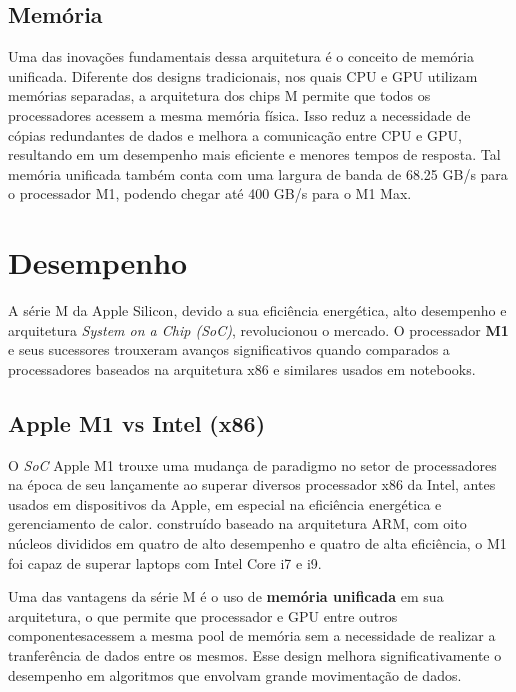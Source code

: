 \documentclass[a4paper,times,12pt]{article}
\begin{document}
\subsection{Memória}
Uma das inovações fundamentais dessa arquitetura é o conceito de memória unificada. Diferente dos designs tradicionais, nos quais CPU e GPU utilizam memórias separadas, a arquitetura dos chips M permite que todos os processadores acessem a mesma memória física. Isso reduz a necessidade de cópias redundantes de dados e melhora a comunicação entre CPU e GPU, resultando em um desempenho mais eficiente e menores tempos de resposta. Tal memória unificada também conta com uma largura de banda de 68.25 GB/s para o processador M1, podendo chegar até 400 GB/s para o M1 Max.

\hspace{+15pt}
\section{Desempenho}

A série M da Apple Silicon, devido a sua eficiência energética, alto desempenho e arquitetura \textit{System on a Chip (SoC)}, revolucionou o mercado. O processador \textbf{M1} e seus sucessores trouxeram avanços significativos quando comparados a processadores baseados na arquitetura x86 e similares usados em notebooks.

\subsection{Apple M1 vs Intel (x86)}
\hspace{+15pt}

O \textit{SoC} Apple M1 trouxe uma mudança de paradigmo no setor de processadores na época de seu lançamente ao superar diversos processador x86 da Intel, antes usados em dispositivos da Apple, em especial na eficiência energética e gerenciamento de calor. construído baseado na arquitetura ARM, com oito núcleos divididos em quatro de alto desempenho e quatro de alta eficiência, o M1 foi capaz de superar laptops com Intel Core i7 e i9.

Uma das vantagens da série M é o uso de \textbf{memória unificada} em sua arquitetura, o que permite que processador e GPU entre outros componentesacessem a mesma pool de memória sem a necessidade de realizar a tranferência de dados entre os mesmos.\cite{apple_silicon_potential} Esse design melhora significativamente o desempenho em algoritmos que envolvam grande movimentação de dados.\cite{apple_m_vs_intel}
\end{document}
